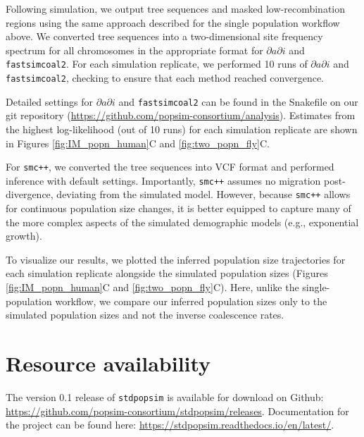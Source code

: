 \documentclass[12pt,halfline,a4paper]{ouparticle}
\newcommand{\stdpopsim}{\texttt{stdpopsim}\xspace}
\newcommand{\dadi}{$\partial a \partial i$\xspace}
\newcommand{\smcpp}{\texttt{smc++}\xspace}
\newcommand{\fastsimcoal}{\texttt{fastsimcoal2}\xspace}
\begin{document}
Following simulation, we output tree sequences and masked low-recombination
regions using the same approach described for the single population workflow above. We
converted tree sequences into a two-dimensional site frequency spectrum for all
chromosomes in the appropriate format for \dadi and \fastsimcoal.
For each simulation
replicate, we performed 10 runs of \dadi and \fastsimcoal, checking to ensure that 
each method reached convergence. 

Detailed settings for \dadi and \fastsimcoal can be found in the Snakefile
on our git repository (\url{https://github.com/popsim-consortium/analysis}).
Estimates from the highest log-likelihood (out of 10 runs) for each simulation replicate
are shown in Figures \ref{fig:IM_popn_human}C and \ref{fig:two_popn_fly}C.

For \smcpp, we converted the tree sequences into VCF format and performed inference
with default settings. Importantly, \smcpp assumes no migration post-divergence,
deviating from the simulated model.  However, because \smcpp allows
for continuous population size changes, it is better equipped to capture many of the
more complex aspects of the simulated demographic models (e.g., exponential growth).

To visualize our results, we plotted the inferred population size trajectories
for each simulation replicate alongside the simulated population sizes
(Figures \ref{fig:IM_popn_human}C and \ref{fig:two_popn_fly}C).
Here, unlike the single-population workflow,
we compare our inferred population sizes only to the simulated population
sizes and not the inverse coalescence rates. 

\section*{Resource availability}
The version 0.1 release of \stdpopsim is available for download on Github:
\url{https://github.com/popsim-consortium/stdpopsim/releases}.
Documentation for the project can be found here:
\url{https://stdpopsim.readthedocs.io/en/latest/}.
\end{document}

